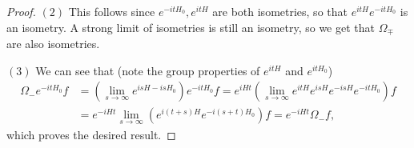 \begin{proof}
  $(2)$ This follows since
  $e^{-itH_0}, e^{itH}$ are both isometries,
  so that $e^{itH} e^{-itH_0}$ is an isometry.
  A strong limit of isometries is still an isometry,
  so we get that $\Omega_{\mp}$ are also isometries.

  $(3)$ We can see that (note the group properties
  of $e^{itH}$ and $e^{itH_0}$)
  \begin{align*}
    \Omega_- e^{-it H_0} f
    &= \left(\lim_{s \to \infty} e^{isH -isH_0}\right)
    e^{-itH_0} f
    = e^{iHt} \left(\lim_{s \to \infty} e^{itH} e^{isH} e^{-isH} e^{-itH_0}\right) f \\
    &= e^{-iHt} \lim_{s \to \infty} \left(e^{i(t + s) H} e^{-i(s + t) H_0}\right) f
    = e^{-iHt} \Omega_- f,
  \end{align*}
  which proves the desired result.
\end{proof}
